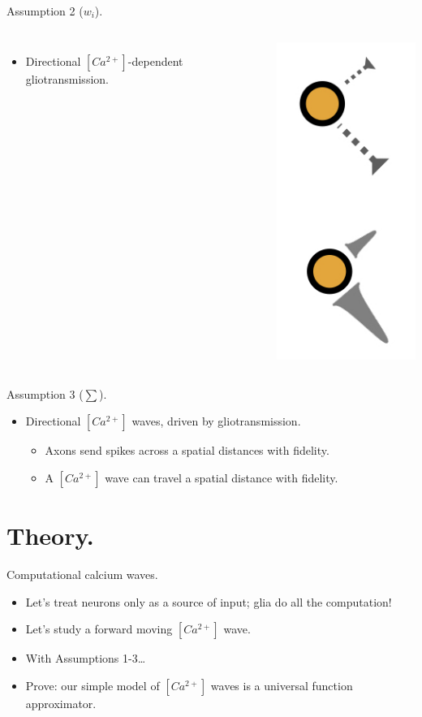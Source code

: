 \documentclass[10pt]{beamer}
\begin{document}
\begin{frame}[fragile]{Assumption 2 ($w_i$).}
\begin{columns}
\begin{itemize}
    \item \alert{Directional} $[Ca^{2+}]$-dependent gliotransmission.
\end{itemize}
    \centering
    \includegraphics[scale=0.4]{images/gliotrans.jpeg}
\end{columns}
\end{frame}

\begin{frame}[fragile]{Assumption 3 ($\sum$).}
\begin{itemize}
    \item \alert{Directional} $[Ca^{2+}]$ waves, driven by gliotransmission.
    \begin{itemize}
    \item Axons send spikes across a spatial distances with fidelity.
    \item A $[Ca^{2+}]$ wave can travel a spatial distance with fidelity.
    \end{itemize}
\end{itemize}
\end{frame}

\section[In theory.]{Theory.}
\begin{frame}[fragile]{Computational calcium waves.}
\begin{itemize}
\item Let's treat neurons only as a source of input; glia do all the computation!
\item Let's study a forward moving $[Ca^{2+}]$ wave.
\item With Assumptions 1-3\ldots
\item \alert{Prove}: our simple model of $[Ca^{2+}]$ waves is a universal function approximator.
\end{itemize}
\end{frame}
\end{document}
